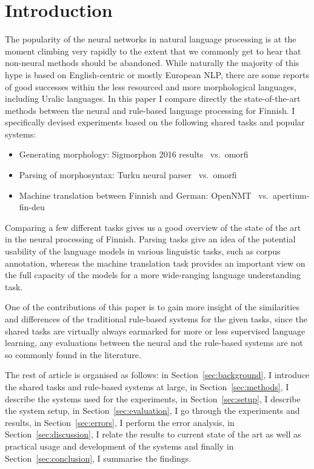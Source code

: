 \documentclass{flammie}
\begin{document}
\section{Introduction}

The popularity of the neural networks in natural language processing is at the
moment climbing very rapidly to the extent that we commonly get to hear that
non-neural methods should be abandoned. While naturally the majority of this
hype is based on English-centric or mostly European NLP, there are some reports
of good successes within the less resourced and more morphological languages,
including Uralic languages. In this paper I compare directly the
state-of-the-art methods between the neural and rule-based language processing
for Finnish. I specifically devised experiments based on the following shared
tasks and popular systems:

\begin{itemize}
    \item Generating morphology: Sigmorphon 2016
        results~\citep{cotterell2016sigmorphon} vs.\
        omorfi~\citep{omorfi}
    \item Parsing of morphosyntax: Turku neural parser~\citep{kanerva2018turku}
        vs.\ omorfi~\citep{omorfi}
    \item Machine translation between Finnish and German:
        OpenNMT~\citep{opennmt} vs.\
        apertium-fin-deu~\citep{pirinen2018rulebased}
\end{itemize}

Comparing a few different tasks gives us a good overview of the state of the art
in the neural processing of Finnish. Parsing tasks give an idea of the potential
usability of the language models in various linguistic tasks, such as corpus
annotation, whereas the machine translation task provides an important view on
the full capacity of the models for a more wide-ranging language understanding
task.

One of the contributions of this paper is to gain more insight of the
similarities and differences of the traditional rule-based systems for the given
tasks, since the shared tasks are virtually always earmarked for more or less
supervised language learning, any evaluations between the neural and the
rule-based systems are not so commonly found in the literature.

The rest of article is organised as follows: in Section~\ref{sec:background},
I introduce the shared tasks and rule-based systems at large, in
Section~\ref{sec:methods}, I describe the systems used for the experiments,
in Section~\ref{sec:setup}, I describe the system setup, in
Section~\ref{sec:evaluation}, I go through the experiments and results,
in Section~\ref{sec:errors}, I perform the error analysis, in
Section~\ref{sec:discussion}, I relate the results to current state of the
art as well as practical usage and development of the systems and finally
in Section~\ref{sec:conclusion}, I summarise the findings.
\end{document}
